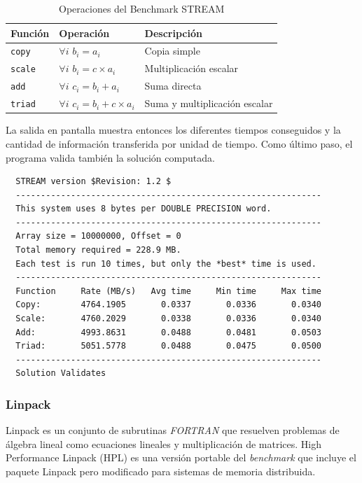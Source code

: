 \documentclass[a4paper]{report}
\begin{document}
\begin{table}[H]
\caption{Operaciones del Benchmark STREAM}
  \centering
    \begin{tabular}{|l|l|l|}\hline
      {\bf Función} & {\bf Operación} & {\bf Descripción} \\ \hline
      {\tt copy} & $ \forall i $ $ b_{i} = a_{i} $ & Copia simple \\ \hline
      {\tt scale} & $ \forall i $ $ b_{i} = c \times a_{i} $ & Multiplicación escalar \\ \hline
      {\tt add} & $ \forall i $ $ c_{i} = b_{i} + a_{i} $ & Suma directa \\ \hline
      {\tt triad} & $ \forall i $ $ c_{i} = b_{i} + c \times a_{i} $ & Suma y multiplicación escalar \\ \hline
    \end{tabular} 
 \label{table:stream}
\end{table}

La salida en pantalla muestra entonces los diferentes tiempos conseguidos y la cantidad de información transferida por unidad de tiempo.
Como último paso, el programa valida también la solución computada.

{\small
\begin{verbatim}
  STREAM version $Revision: 1.2 $
  -------------------------------------------------------------
  This system uses 8 bytes per DOUBLE PRECISION word.
  -------------------------------------------------------------
  Array size = 10000000, Offset = 0
  Total memory required = 228.9 MB.
  Each test is run 10 times, but only the *best* time is used.
  -------------------------------------------------------------
  Function     Rate (MB/s)   Avg time     Min time     Max time
  Copy:        4764.1905       0.0337       0.0336       0.0340
  Scale:       4760.2029       0.0338       0.0336       0.0340
  Add:         4993.8631       0.0488       0.0481       0.0503
  Triad:       5051.5778       0.0488       0.0475       0.0500
  -------------------------------------------------------------
  Solution Validates
\end{verbatim}
}

\subsubsection{Linpack}

Linpack \cite{linpack} es un conjunto de subrutinas {\it FORTRAN} que resuelven
problemas de álgebra lineal como ecuaciones lineales y multiplicación de
matrices. High Performance Linpack (HPL) \cite{hpl} es una versión portable del {\it benchmark} que incluye
el paquete Linpack pero modificado para sistemas de memoria distribuida.
\end{document}
